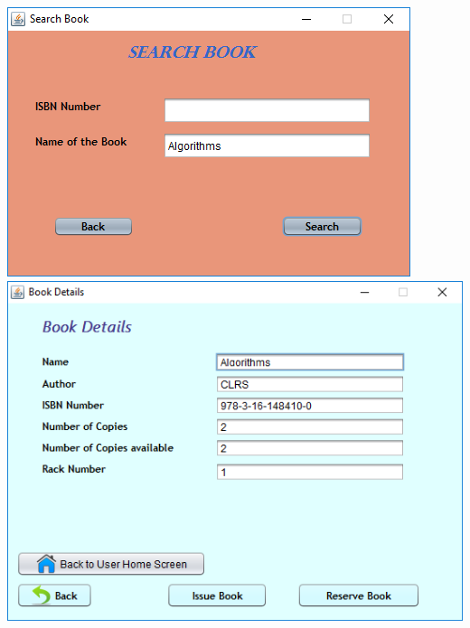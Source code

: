 \documentclass{article}
\begin{document}
\begin{enumerate}
\begin{itemize}
\includegraphics[scale=0.8]{images/UserLogin/Actions/SearchExisting/SearchByName/SearchExistingBook.PNG}\\
\includegraphics[scale=0.8]{images/UserLogin/Actions/SearchExisting/SearchByName/Found.PNG}\\


\end{itemize}
\end{enumerate}
\end{document}
